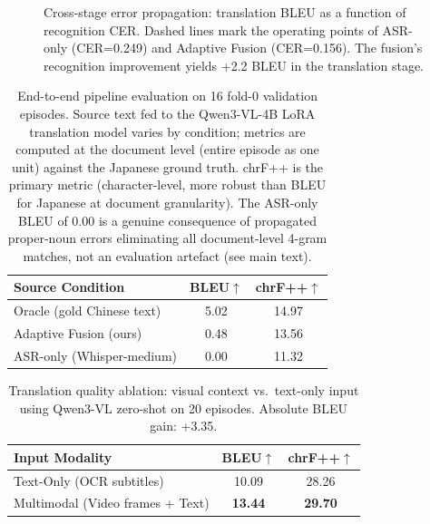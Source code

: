 \documentclass[11pt]{article}
\begin{document}
\begin{figure}[t]
\centering
{}
\caption{Cross-stage error propagation: translation BLEU as a function of recognition CER. Dashed lines mark the operating points of ASR-only (CER=0.249) and Adaptive Fusion (CER=0.156). The fusion's recognition improvement yields +2.2 BLEU in the translation stage.}
\label{fig:error_prop}
\end{figure}

\begin{table}[t]
\caption{End-to-end pipeline evaluation on 16 fold-0 validation episodes. Source text fed to the Qwen3-VL-4B LoRA translation model varies by condition; metrics are computed at the document level (entire episode as one unit) against the Japanese ground truth. chrF++ is the primary metric (character-level, more robust than BLEU for Japanese at document granularity). The ASR-only BLEU of 0.00 is a genuine consequence of propagated proper-noun errors eliminating all document-level 4-gram matches, not an evaluation artefact (see main text).}
\label{tab:e2e}
\centering
\begin{tabular}{lcc}
\toprule
\textbf{Source Condition} & \textbf{BLEU}$\uparrow$ & \textbf{chrF++}$\uparrow$ \\
\midrule
Oracle (gold Chinese text)   & 5.02 & 14.97 \\
Adaptive Fusion (ours)       & 0.48 & 13.56 \\
ASR-only (Whisper-medium)    & 0.00 & 11.32 \\
\bottomrule
\end{tabular}
\end{table}

\begin{table}[t]
\centering
\caption{Translation quality ablation: visual context vs.\ text-only input using Qwen3-VL zero-shot on 20 episodes. Absolute BLEU gain: +3.35.}
\label{tab:ablation_context}
\begin{tabular}{lcc}
\toprule
\textbf{Input Modality} & \textbf{BLEU}$\uparrow$ & \textbf{chrF++}$\uparrow$ \\
\midrule
Text-Only (OCR subtitles)       & 10.09 & 28.26 \\
Multimodal (Video frames + Text) & \textbf{13.44} & \textbf{29.70} \\
\bottomrule
\end{tabular}
\end{table}
\end{document}

